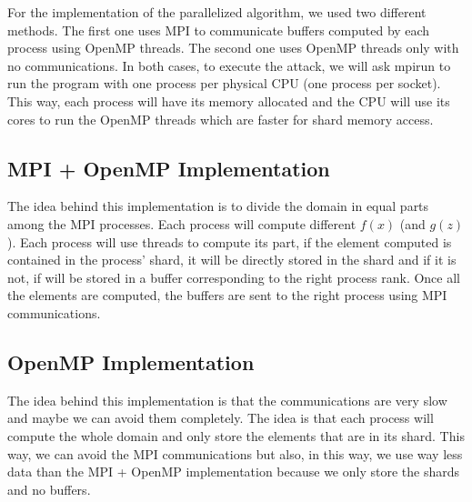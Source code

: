 \documentclass[12pt]{article}
\begin{document}
For the implementation of the parallelized algorithm, we used two different methods. The first
one uses MPI to communicate buffers computed by each process using OpenMP threads. The second one uses OpenMP
threads only with no communications. In both cases, to execute the attack, we will ask mpirun to
run the program with one process per physical CPU (one process per socket). This way, each
process will have its memory allocated and the CPU will use its cores to run the OpenMP threads which
are faster for shard memory access.

\subsection{MPI + OpenMP Implementation}
The idea behind this implementation is to divide the domain in equal parts among the MPI processes.
Each process will compute different \(f(x)\) (and \(g(z)\)). Each process will use threads to compute its part,
if the element computed is contained in the process' shard, it will be directly stored in the shard and
if it is not, if will be stored in a buffer corresponding to the right process rank. Once all the elements
are computed, the buffers are sent to the right process using MPI communications.

\subsection{OpenMP Implementation}
The idea behind this implementation is that the communications are very slow and maybe we can avoid them
completely. The idea is that each process will compute the whole domain and only store the elements that
are in its shard. This way, we can avoid the MPI communications but also,
in this way, we use way less data than the MPI + OpenMP implementation because we only store the shards
and no buffers.
\end{document}
